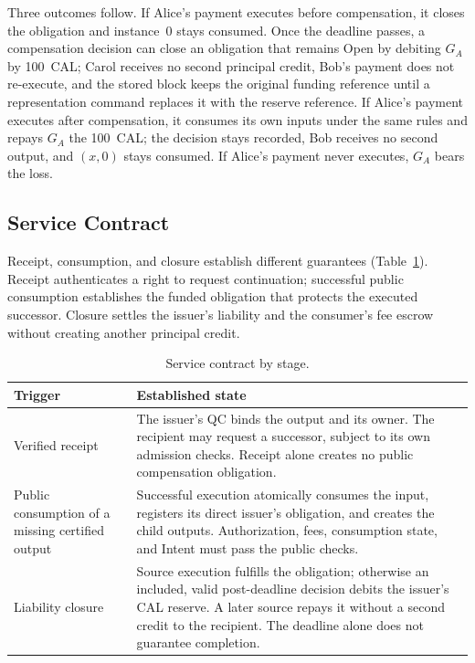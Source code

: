 Three outcomes follow. If Alice's payment executes before compensation, it closes the obligation and instance~0 stays consumed. Once the deadline passes, a compensation decision can close an obligation that remains Open by debiting $G_A$ by 100~CAL; Carol receives no second principal credit, Bob's payment does not re-execute, and the stored block keeps the original funding reference until a representation command replaces it with the reserve reference. If Alice's payment executes after compensation, it consumes its own inputs under the same rules and repays $G_A$ the 100~CAL; the decision stays recorded, Bob receives no second output, and $(x,0)$ stays consumed. If Alice's payment never executes, $G_A$ bears the loss.

\subsection{Service Contract}
\label{sec:model-contract}
Receipt, consumption, and closure establish different guarantees
(Table~\ref{tab:model-contract}). Receipt authenticates a right to request
continuation; successful public consumption establishes the funded obligation
that protects the executed successor. Closure settles the issuer's liability
and the consumer's fee escrow without creating another principal credit.

\begin{table}[!t]
\caption{Service contract by stage.}
\label{tab:model-contract}
\centering\small
\begin{tabular}{@{}>{\raggedright\arraybackslash}p{}>{\raggedright\arraybackslash}p{}@{}}
\toprule
Trigger & Established state \\
\midrule
Verified receipt &
The issuer's QC binds the output and its owner. The recipient may
request a successor, subject to its own admission checks. Receipt
alone creates no public compensation obligation. \\
Public consumption of a missing certified output &
Successful execution atomically consumes the input, registers its
direct issuer's obligation, and creates the child outputs.
Authorization, fees, consumption state, and Intent must pass the
public checks. \\
Liability closure &
Source execution fulfills the obligation; otherwise an included,
valid post-deadline decision debits the issuer's CAL reserve.
A later source repays it without a second credit to the recipient.
The deadline alone does not guarantee completion. \\
\bottomrule
\end{tabular}
\end{table}

